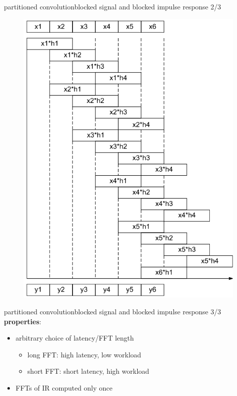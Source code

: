 	\begin{frame}{partitioned convolution}{blocked signal and blocked impulse response 2/3}
		\vspace{-5mm}
		\begin{figure}
			\centering
				\includegraphics[scale=.35]{graph/conv_fast2}
		\end{figure}
	\end{frame}

	\begin{frame}{partitioned convolution}{blocked signal and blocked impulse response 3/3}
		\textbf{properties}:
		\begin{itemize}
			\item	arbitrary choice of latency/FFT length 
				\begin{itemize}
					\item	long FFT: high latency, low workload
					\item	short FFT: short latency, high workload
				\end{itemize}
			\item	FFTs of IR computed only once
		\end{itemize}
	\end{frame}

